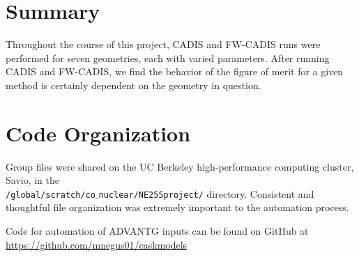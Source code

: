 \documentclass[10pt]{article}
\begin{document}


\section{Summary}

Throughout the course of this project, CADIS and FW-CADIS runs were performed for seven geometries, each with varied parameters. After running CADIS and FW-CADIS, we find the behavior of the figure of merit for a given method is certainly dependent on the geometry in question. 

\label{sec:sum}

\printbibliography

\appendix
\section{Code Organization}
\label{app:code-org}

Group files were shared on the UC Berkeley high-performance computing cluster, Savio, in the\\ \texttt{/global/scratch/co$\_$nuclear/NE255project/} directory. Consistent and thoughtful file organization was extremely important to the automation process.

Code for automation of ADVANTG inputs can be found on GitHub at \url{https://github.com/mnegus01/caskmodels}

\begin{figure}[!ht]

\caption{}
\label{docs:advantg}
\end{figure}

\begin{figure}[!ht]

\caption{}
\label{docs:mcnp}
\end{figure}

\begin{table}

\end{table}
\end{document}

